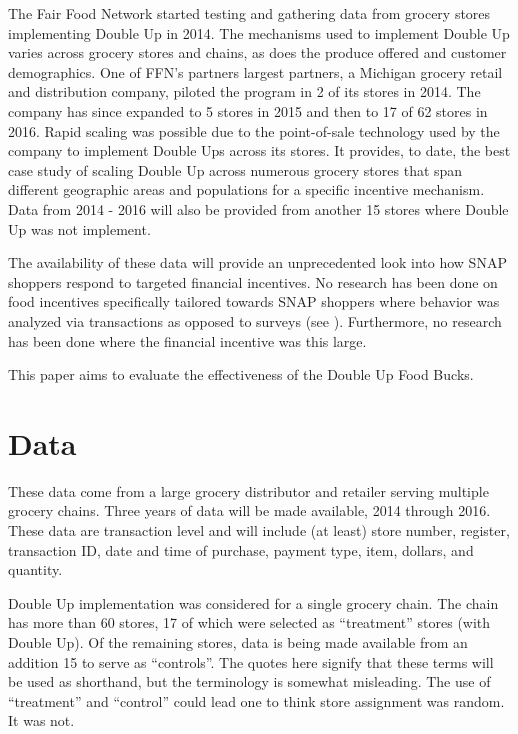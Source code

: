 \documentclass[12pt,letterpaperpaper,]{book}
\begin{document}
The Fair Food Network started testing and gathering data from grocery
stores implementing Double Up in 2014. The mechanisms used to implement
Double Up varies across grocery stores and chains, as does the produce
offered and customer demographics. One of FFN's partners largest
partners, a Michigan grocery retail and distribution company, piloted
the program in 2 of its stores in 2014. The company has since expanded
to 5 stores in 2015 and then to 17 of 62 stores in 2016. Rapid scaling
was possible due to the point-of-sale technology used by the company to
implement Double Ups across its stores. It provides, to date, the best
case study of scaling Double Up across numerous grocery stores that span
different geographic areas and populations for a specific incentive
mechanism. Data from 2014 - 2016 will also be provided from another 15
stores where Double Up was not implement.

The availability of these data will provide an unprecedented look into
how SNAP shoppers respond to targeted financial incentives. No research
has been done on food incentives specifically tailored towards SNAP
shoppers where behavior was analyzed via transactions as opposed to
surveys (see \citep{bartlett_evaluation_2014}). Furthermore, no research
has been done where the financial incentive was this large.

This paper aims to evaluate the effectiveness of the Double Up Food
Bucks.

\section{Data}\label{data-1}

These data come from a large grocery distributor and retailer serving
multiple grocery chains. Three years of data will be made available,
2014 through 2016. These data are transaction level and will include (at
least) store number, register, transaction ID, date and time of
purchase, payment type, item, dollars, and quantity.

Double Up implementation was considered for a single grocery chain. The
chain has more than 60 stores, 17 of which were selected as
``treatment'' stores (with Double Up). Of the remaining stores, data is
being made available from an addition 15 to serve as ``controls''. The
quotes here signify that these terms will be used as shorthand, but the
terminology is somewhat misleading. The use of ``treatment'' and
``control'' could lead one to think store assignment was random. It was
not.
\end{document}

